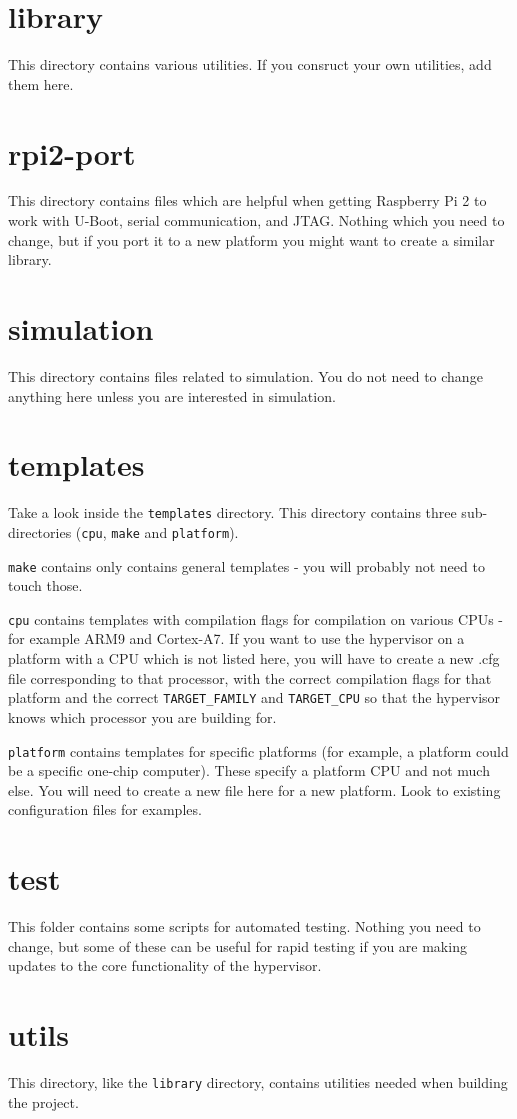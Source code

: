 \documentclass[a4paper,11pt,reqno]{amsart}
\begin{document}
\section{library}

This directory contains various utilities. If you consruct your own utilities, add them here.

\section{rpi2-port}

This directory contains files which are helpful when getting Raspberry Pi 2 to work with U-Boot, serial communication, and JTAG. Nothing which you need to change, but if you port it to a new platform you might want to create a similar library.

\section{simulation}

This directory contains files related to simulation. You do not need to change anything here unless you are interested in simulation.

\section{templates}
Take a look inside the \texttt{templates} directory. This directory contains three sub-directories (\texttt{cpu}, \texttt{make} and \texttt{platform}).

\texttt{make} contains only contains general templates - you will probably not need to touch those.

\texttt{cpu} contains templates with compilation flags for compilation on various CPUs - for example ARM9 and Cortex-A7. If you want to use the hypervisor on a platform with a CPU which is not listed here, you will have to create a new .cfg file corresponding to that processor, with the correct compilation flags for that platform and the correct \texttt{TARGET_FAMILY} and \texttt{TARGET_CPU} so that the hypervisor knows which processor you are building for.

\texttt{platform} contains templates for specific platforms (for example, a platform could be a specific one-chip computer). These specify a platform CPU and not much else. You will need to create a new file here for a new platform. Look to existing configuration files for examples.

\section{test}

This folder contains some scripts for automated testing. Nothing you need to change, but some of these can be useful for rapid testing if you are making updates to the core functionality of the hypervisor.

\section{utils}

This directory, like the \texttt{library} directory, contains utilities needed when building the project.
\end{document}
